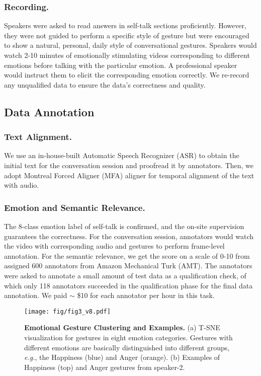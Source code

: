 \documentclass[runningheads]{llncs}
\begin{document}
\vspace{-0.5cm}

\subsubsection{Recording.} Speakers were asked to read answers in self-talk sections proficiently. However, they were not guided to perform a specific style of gesture but were encouraged to show a natural, personal, daily style of conversational gestures. Speakers would watch 2-10 minutes of emotionally stimulating videos corresponding to different emotions before talking with the particular emotion. A professional speaker would instruct them to elicit the corresponding emotion correctly. We re-record any unqualified data to ensure the data's correctness and quality.



\subsection{Data Annotation}
\subsubsection{Text Alignment.} We use an in-house-built Automatic Speech Recognizer (ASR) to obtain the initial text for the conversation session and proofread it by annotators. Then, we adopt Montreal Forced Aligner (MFA) aligner \cite{mcauliffe2017montreal} for temporal alignment of the text with audio.

\vspace{-0.5cm}
\subsubsection{Emotion and Semantic Relevance.} The 8-class emotion label of self-talk is confirmed, and the on-site supervision guarantees the correctness. For the conversation session, annotators would watch the video with corresponding audio and gestures to perform frame-level annotation. For the semantic relevance, we get the score on a scale of 0-10 from assigned 600 annotators from Amazon Mechanical Turk (AMT). The annotators were asked to annotate a small amount of test data as a qualification check, of which only 118 annotators succeeded in the qualification phase for the final data annotation. We paid $\sim$ \$10 for each annotator per hour in this task. 


\begin{figure}
    \centering
    \texttt{[image: fig/fig3\_v8.pdf]}
    \vspace{-0.7cm}
    \caption{\textbf{Emotional Gesture Clustering and Examples.} (a) T-SNE visualization for gestures in eight emotion categories. Gestures with different emotions are basically distinguished into different groups, \textit{e.g.}, the Happiness (blue) and Anger (orange). (b) Examples of Happiness (top) and Anger gestures from speaker-2.}
    \label{fig:fig3}
\end{figure} 
\end{document}
